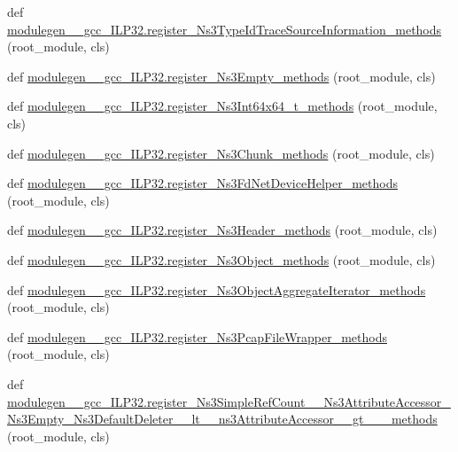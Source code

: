 \begin{DoxyCompactItemize}
def \hyperlink{namespacemodulegen____gcc__ILP32_a839bc77808351c50cde37c45869c9ac2}{modulegen\+\_\+\+\_\+gcc\+\_\+\+I\+L\+P32.\+register\+\_\+\+Ns3\+Type\+Id\+Trace\+Source\+Information\+\_\+methods} (root\+\_\+module, cls)
\item 
def \hyperlink{namespacemodulegen____gcc__ILP32_aaaf5b4399b80410455abaa6263f1cd29}{modulegen\+\_\+\+\_\+gcc\+\_\+\+I\+L\+P32.\+register\+\_\+\+Ns3\+Empty\+\_\+methods} (root\+\_\+module, cls)
\item 
def \hyperlink{namespacemodulegen____gcc__ILP32_a162a098f5d929c52ad2e6c3ed1f54204}{modulegen\+\_\+\+\_\+gcc\+\_\+\+I\+L\+P32.\+register\+\_\+\+Ns3\+Int64x64\+\_\+t\+\_\+methods} (root\+\_\+module, cls)
\item 
def \hyperlink{namespacemodulegen____gcc__ILP32_acca0b09c03a65420f803907cd64df814}{modulegen\+\_\+\+\_\+gcc\+\_\+\+I\+L\+P32.\+register\+\_\+\+Ns3\+Chunk\+\_\+methods} (root\+\_\+module, cls)
\item 
def \hyperlink{namespacemodulegen____gcc__ILP32_a4cc7cc03df082473aca54b1287bc0745}{modulegen\+\_\+\+\_\+gcc\+\_\+\+I\+L\+P32.\+register\+\_\+\+Ns3\+Fd\+Net\+Device\+Helper\+\_\+methods} (root\+\_\+module, cls)
\item 
def \hyperlink{namespacemodulegen____gcc__ILP32_aa49e4221854466e73c3442d993373495}{modulegen\+\_\+\+\_\+gcc\+\_\+\+I\+L\+P32.\+register\+\_\+\+Ns3\+Header\+\_\+methods} (root\+\_\+module, cls)
\item 
def \hyperlink{namespacemodulegen____gcc__ILP32_a214a6e153873bc8ca6880fc3f4cb4cb0}{modulegen\+\_\+\+\_\+gcc\+\_\+\+I\+L\+P32.\+register\+\_\+\+Ns3\+Object\+\_\+methods} (root\+\_\+module, cls)
\item 
def \hyperlink{namespacemodulegen____gcc__ILP32_aa803b137018709bb9ce4e0561d4ce0c7}{modulegen\+\_\+\+\_\+gcc\+\_\+\+I\+L\+P32.\+register\+\_\+\+Ns3\+Object\+Aggregate\+Iterator\+\_\+methods} (root\+\_\+module, cls)
\item 
def \hyperlink{namespacemodulegen____gcc__ILP32_a098ccd45f3d1d9022ed87c5c0f7d7099}{modulegen\+\_\+\+\_\+gcc\+\_\+\+I\+L\+P32.\+register\+\_\+\+Ns3\+Pcap\+File\+Wrapper\+\_\+methods} (root\+\_\+module, cls)
\item 
def \hyperlink{namespacemodulegen____gcc__ILP32_ac3ab36c44430c9b0f0301233bd18935b}{modulegen\+\_\+\+\_\+gcc\+\_\+\+I\+L\+P32.\+register\+\_\+\+Ns3\+Simple\+Ref\+Count\+\_\+\+\_\+\+Ns3\+Attribute\+Accessor\+\_\+\+Ns3\+Empty\+\_\+\+Ns3\+Default\+Deleter\+\_\+\+\_\+lt\+\_\+\+\_\+ns3\+Attribute\+Accessor\+\_\+\+\_\+gt\+\_\+\+\_\+\+\_\+methods} (root\+\_\+module, cls)

\end{DoxyCompactItemize}
